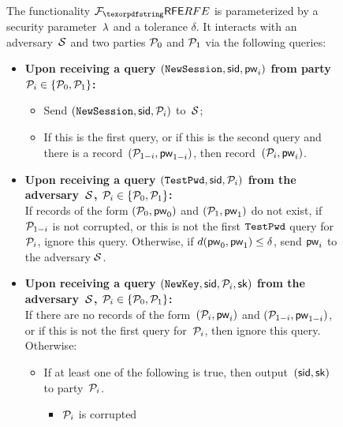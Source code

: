 \begin{figure}[tb]
  \centering
  \begin{fboxenv}
    \begin{minipage}{0.95\textwidth}
      The functionality $\Frfe$ is parameterized by a security parameter~$\lambda$ and a tolerance $\delta$.
      It interacts with an adversary~$\mathcal{S}$ and two parties $\mathcal{P}_{0}$ and $\mathcal{P}_{1}$ via the following queries:\\[-1.8em]
      \begin{itemize}
      \item
        \textbf{Upon receiving a query
        $(\texttt{NewSession},\mathsf{sid},\mathsf{pw}_{i})$ from party $\mathcal{P}_{i} \in \{\mathcal{P}_{0},\mathcal{P}_{1}\}$:}
        \begin{itemize}
          \item Send $(\texttt{NewSession},\mathsf{sid},\mathcal{P}_{i})$ to~$\mathcal{S}$;
          \item If this is the first \NewSession query,
          or if this is the second \NewSession query and there is a record~$(\mathcal{P}_{1-i},\mathsf{pw}_{1-i})$,
          then record~$(\mathcal{P}_{i},\mathsf{pw}_{i})$.
        \end{itemize}
      \item 
        \textbf{Upon receiving a query
          $(\texttt{TestPwd},\mathsf{sid},\mathcal{P}_{i})$ from the adversary~$\mathcal{S}$, $\mathcal{P}_{i} \in \{\mathcal{P}_{0},\mathcal{P}_{1}\}$:} \\
        If records of the form $(\mathcal{P}_{0}, \mathsf{pw}_{0})$ and $(\mathcal{P}_{1}, \mathsf{pw}_{1})$ do not exist, if $\mathcal{P}_{1-i}$ is not corrupted, or this is not the first $\texttt{TestPwd}$ query for $\mathcal{P}_{i}$, ignore this query.
        Otherwise, if $d(\mathsf{pw}_{0}, \mathsf{pw}_{1}) \leq \delta$, send $\mathsf{pw}_{i}$ to the adversary $\mathcal{S}$.
      \item
        \textbf{Upon receiving a query
          $(\texttt{NewKey},\mathsf{sid},\mathcal{P}_{i},\mathsf{sk})$ from the adversary~$\mathcal{S}$, $\mathcal{P}_{i} \in \{\mathcal{P}_{0},\mathcal{P}_{1}\}$:} \\
        If there are no records of the form~$(\mathcal{P}_{i},\mathsf{pw}_{i})$ and $(\mathcal{P}_{1-i}, \mathsf{pw}_{1-i})$, or if this is not the first \NewKey query for~$\mathcal{P}_{i}$, then ignore this query. 
        Otherwise:
        \begin{itemize}
        \item If at least one of the following is true, then output~$(\mathsf{sid},\mathsf{sk})$ to party~$\mathcal{P}_{i}$.
          \begin{itemize}
           \item $\mathcal{P}_{i}$ is corrupted

\end{itemize}
\end{itemize}
\end{itemize}
\end{minipage}
\end{fboxenv}
\end{figure}
